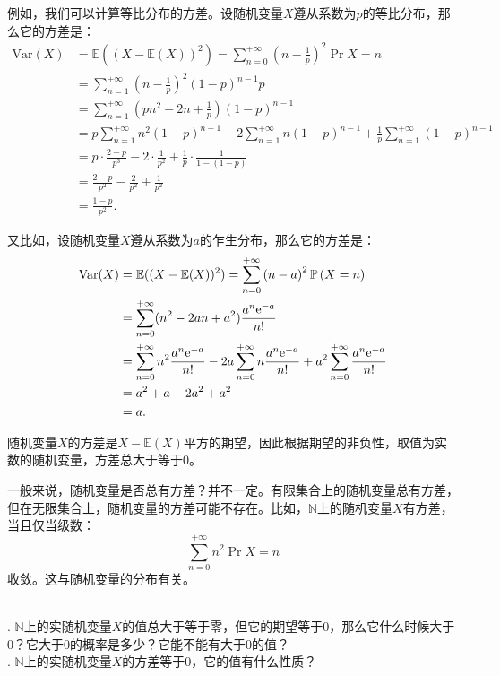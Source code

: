 \documentclass[12pt,UTF8]{ctexbook}
\begin{document}
例如，我们可以计算等比分布的方差。设随机变量$X$遵从系数为$p$的等比分布，那么它的方差是：
\begin{align*}
    \text{Var}(X) &= \mathbb{E}((X - \mathbb{E}(X))^2) = \sum_{n=0}^{+\infty} \left(n - \frac{1}{p}\right)^2 \Pr{X=n} \\
    &= \sum_{n=1}^{+\infty} \left(n - \frac{1}{p}\right)^2 (1 - p)^{n-1} p \\
    &= \sum_{n=1}^{+\infty} \left(pn^2 - 2n + \frac{1}{p}\right) (1 - p)^{n-1} \\
    &= p\sum_{n=1}^{+\infty} n^2 (1 - p)^{n-1} - 2\sum_{n=1}^{+\infty} n (1 - p)^{n-1} + \frac{1}{p}\sum_{n=1}^{+\infty} (1 - p)^{n-1} \\
    &= p\cdot \frac{2 - p}{p^3} - 2\cdot \frac{1}{p^2} + \frac{1}{p}\cdot \frac{1}{1 - (1 - p)} \\
    &= \frac{2 - p}{p^2} - \frac{2}{p^2} + \frac{1}{p^2} \\
    &= \frac{1 - p}{p^2}.
\end{align*}

又比如，设随机变量$X$遵从系数为$a$的乍生分布，那么它的方差是：
\begin{align*}
    \text{Var}(X) &= \mathbb{E}((X - \mathbb{E}(X))^2) = \sum_{n=0}^{+\infty} \left(n - a\right)^2 \mathbb{P}\left(X=n\right) \\
    &= \sum_{n=0}^{+\infty} (n^2 - 2an + a^2) \frac{a^n\mathrm{e}^{-a}}{n!} \\
    &= \sum_{n=0}^{+\infty} n^2 \frac{a^n\mathrm{e}^{-a}}{n!} - 2a\sum_{n=0}^{+\infty} n \frac{a^n\mathrm{e}^{-a}}{n!} + a^2\sum_{n=0}^{+\infty} \frac{a^n\mathrm{e}^{-a}}{n!} \\
    &= a^2 + a - 2a^2 + a^2 \\
    &= a.
\end{align*}

随机变量$X$的方差是$X - \mathbb{E}(X)$平方的期望，因此根据期望的非负性，取值为实数的随机变量，方差总大于等于$0$。

一般来说，随机变量是否总有方差？并不一定。有限集合上的随机变量总有方差，但在无限集合上，随机变量的方差可能不存在。比如，$\mathbb{N}$上的随机变量$X$有方差，当且仅当级数：
\[
    \sum_{n=0}^{+\infty} n^2 \Pr{X=n}
\]
收敛。这与随机变量的分布有关。

\begin{sk}
    \mbox{}\\
    . $\mathbb{N}$上的实随机变量$X$的值总大于等于零，但它的期望等于$0$，那么它什么时候大于$0$？它大于$0$的概率是多少？它能不能有大于$0$的值？\\
    . $\mathbb{N}$上的实随机变量$X$的方差等于$0$，它的值有什么性质？
\end{sk}
\end{document}
